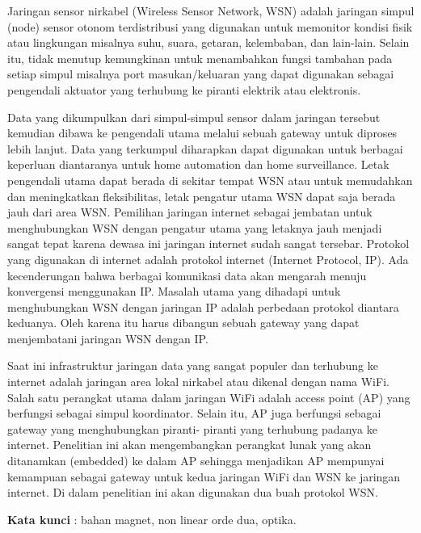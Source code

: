\documentclass{jtetiproposalskripsi}
\begin{document}
\cover

\approvalpage


\begin{abstractind}
Jaringan sensor nirkabel (Wireless Sensor Network, WSN) adalah jaringan simpul (node) sensor otonom terdistribusi yang digunakan untuk memonitor kondisi fisik atau lingkungan misalnya suhu, suara, getaran, kelembaban, dan lain-lain. Selain itu, tidak menutup kemungkinan untuk menambahkan fungsi tambahan pada setiap simpul misalnya port masukan/keluaran yang dapat digunakan sebagai pengendali aktuator yang terhubung ke piranti elektrik atau elektronis.

Data yang dikumpulkan dari simpul-simpul sensor dalam jaringan tersebut kemudian dibawa ke pengendali utama melalui sebuah gateway untuk diproses lebih lanjut. Data yang terkumpul diharapkan dapat digunakan untuk berbagai keperluan diantaranya untuk home automation dan home surveillance. Letak pengendali utama dapat berada di sekitar tempat WSN atau untuk memudahkan dan meningkatkan fleksibilitas, letak pengatur utama WSN dapat saja berada jauh dari area WSN. Pemilihan jaringan internet sebagai jembatan untuk menghubungkan WSN dengan pengatur utama yang letaknya jauh menjadi sangat tepat karena dewasa ini jaringan internet sudah sangat tersebar. Protokol yang digunakan di internet adalah protokol internet (Internet Protocol, IP). Ada kecenderungan bahwa berbagai komunikasi data akan mengarah menuju konvergensi menggunakan IP. Masalah utama yang dihadapi untuk menghubungkan WSN dengan jaringan IP adalah perbedaan protokol diantara keduanya. Oleh karena itu harus dibangun sebuah gateway yang dapat menjembatani jaringan WSN dengan IP.

Saat ini infrastruktur jaringan data yang sangat populer dan terhubung ke internet adalah jaringan area lokal nirkabel atau dikenal dengan nama WiFi. Salah satu perangkat utama dalam jaringan WiFi adalah access point (AP) yang berfungsi sebagai simpul koordinator. Selain itu, AP juga berfungsi sebagai gateway yang menghubungkan piranti- piranti yang terhubung padanya ke internet. Penelitian ini akan mengembangkan perangkat lunak yang akan ditanamkan (embedded) ke dalam AP sehingga menjadikan AP mempunyai kemampuan sebagai gateway untuk kedua jaringan WiFi dan WSN ke jaringan internet. Di dalam penelitian ini akan digunakan dua buah protokol WSN. 

\bigskip
\textbf{Kata kunci} : bahan magnet, non linear orde dua, optika.
\end{abstractind}
\end{document}
